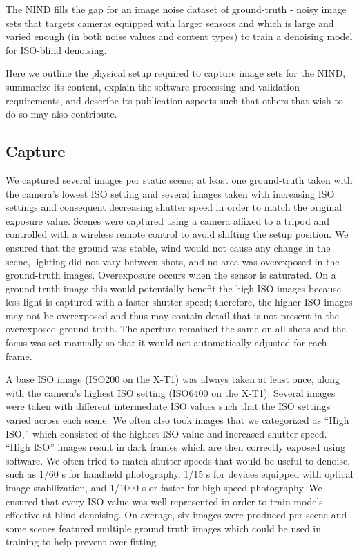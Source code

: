 The \acf{NIND} fills the gap for an image noise dataset of ground-truth - noisy image sets that targets cameras equipped with larger sensors and which is large and varied enough (in both noise values and content types) to train a denoising model for ISO-blind denoising.%

Here we outline the physical setup required to capture image sets for the \ac{NIND}, summarize its content, explain the software processing and validation requirements, and describe its publication aspects such that others that wish to do so may also contribute.
\subsection{Capture}
We captured several images per static scene; at least one ground-truth taken with the camera's lowest ISO setting and several images taken with increasing ISO settings and consequent decreasing shutter speed in order to match the original exposure value. Scenes were captured using a camera affixed to a tripod and controlled with a wireless remote control to avoid shifting the setup position. We ensured that the ground was stable, wind would not cause any change in the scene, lighting did not vary between shots, and no area was overexposed in the ground-truth images. Overexposure occurs when the sensor is saturated. On a ground-truth image this would potentially benefit the high ISO images because less light is captured with a faster shutter speed; therefore, the higher ISO images may not be overexposed and thus may contain detail that is not present in the overexposed ground-truth. The aperture remained the same on all shots and the focus was set manually so that it would not automatically adjusted for each frame.

A base ISO image (ISO200 on the \acl{X-T1}) was always taken at least once, along with the camera's highest ISO setting (ISO6400 on the \acs{X-T1}). Several images were taken with different intermediate ISO values such that the ISO settings varied across each scene. We often also took images that we categorized as ``High ISO,'' which consisted of the highest ISO value and increased shutter speed. ``High ISO'' images result in dark frames which are then correctly exposed using software. We often tried to match shutter speeds that would be useful to denoise, such as 1/60 s for handheld photography, 1/15 s for devices equipped with optical image stabilization, and 1/1000 s or faster for high-speed photography. We ensured that every ISO value was well represented in order to train models effective at blind denoising. On average, six images were produced per scene and some scenes featured multiple ground truth images which could be used in training to help prevent over-fitting.
